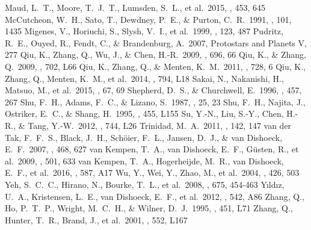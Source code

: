 \documentclass[twocolumn]{aastex61}
\begin{document}
\begin{thebibliography}{}
 Maud, L.~T., Moore, T.~J.~T., Lumsden, S.~L., et al.\ 2015, \mnras, 453, 645
 McCutcheon, W.~H., Sato, T., Dewdney, P.~E., \& Purton, C.~R.\ 1991, \aj, 101, 1435 
 Migenes, V., Horiuchi, S., Slysh, V.~I., et al.\ 1999, \apjs, 123, 487
 Pudritz, R.~E., Ouyed, R., Fendt, C., \& Brandenburg, A.\ 2007, Protostars and Planets V, 277
 Qiu, K., Zhang, Q., Wu, J., \& Chen, H.-R.\ 2009, \apj, 696, 66
 Qiu, K., \& Zhang, Q.\ 2009, \apjl, 702, L66
 Qiu, K., Zhang, Q., \& Menten, K.~M.\ 2011, \apj, 728, 6
 Qiu, K., Zhang, Q., Menten, K.~M., et al.\ 2014, \apjl, 794, L18 
 Sakai, N., Nakanishi, H., Matsuo, M., et al.\ 2015, \pasj, 67, 69
 Shepherd, D.~S., \& Churchwell, E.\ 1996, \apj, 457, 267 
 Shu, F.~H., Adams, F.~C., \& Lizano, S.\ 1987, \araa, 25, 23 
 Shu, F.~H., Najita, J., Ostriker, E.~C., \& Shang, H.\ 1995, \apjl, 455, L155 
 Su, Y.-N., Liu, S.-Y., Chen, H.-R., \& Tang, Y.-W.\ 2012, \apjl, 744, L26 
 Trinidad, M.~A.\ 2011, \aj, 142, 147 
 van der Tak, F.~F.~S., Black, J.~H., Sch{\"o}ier, F.~L., Jansen, D.~J., \& van Dishoeck, E.~F.\ 2007, \aap, 468, 627
 van Kempen, T.~A., van Dishoeck, E.~F., G{\"u}sten, R., et al.\ 2009, \aap, 501, 633 
 van Kempen, T.~A., Hogerheijde, M.~R., van Dishoeck, E.~F., et al.\ 2016, \aap, 587, A17
 Wu, Y., Wei, Y., Zhao, M., et al.\ 2004, \aap, 426, 503
 Yeh, S.~C.~C., Hirano, N., Bourke, T.~L., et al.\ 2008, \apj, 675, 454-463
 Y{\i}ld{\i}z, U.~A., Kristensen, L.~E., van Dishoeck, E.~F., et al.\ 2012, \aap, 542, A86
 Zhang, Q., Ho, P.~T.~P., Wright, M.~C.~H., \& Wilner, D.~J.\ 1995, \apjl, 451, L71 
 Zhang, Q., Hunter, T.~R., Brand, J., et al.\ 2001, \apjl, 552, L167 

\end{thebibliography}
\end{document}
